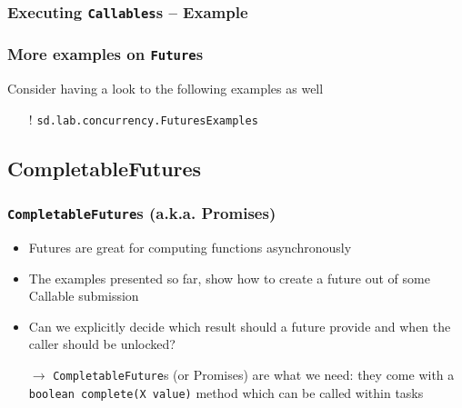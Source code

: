 \documentclass{beamer}\mode<presentation>{\usetheme{AMSCesenaPurpleAndGold}}
\begin{document}
\begin{frame}%
\frametitle{Executing \texttt{Callables}s -- Example}

	
	
\end{frame}

\begin{frame}[c]\frametitle{More examples on \texttt{Future}s}
	
	Consider having a look to the following examples as well
	\begin{itemize}
		\item[!] \texttt{sd.lab.concurrency.\alert{FuturesExamples}}
	\end{itemize}

\end{frame}

\subsection{CompletableFutures}

\begin{frame}[allowframebreaks]
\frametitle{\texttt{CompletableFuture}s (a.k.a. Promises)}

	\begin{itemize}
		\item Futures are great for computing functions \alert{asynchronously}
		
		\medskip
		
		\item The examples presented so far, show how to create a future out of some Callable submission
		
		\medskip
		
		\item Can we explicitly decide which result should a future provide and when the caller should be unlocked?
		
		\bigskip
		
		\item[$\rightarrow$] \texttt{\alert{CompletableFuture}}s (or Promises) are what we need: they come with a \texttt{boolean complete(X value)} method which can be called within tasks
	\end{itemize}
	
	\framebreak
	
	

\end{frame}
\end{document}
